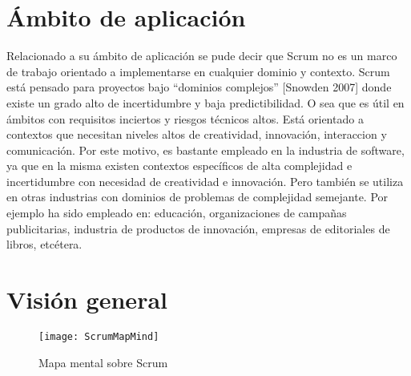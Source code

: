 \section{Ámbito de aplicación}

Relacionado a su ámbito de aplicación se pude decir que Scrum no es un marco de trabajo orientado a implementarse en cualquier dominio y contexto. Scrum está pensado para proyectos bajo “dominios complejos” [Snowden 2007] donde existe un grado alto de incertidumbre y baja predictibilidad. O sea que es útil en ámbitos con requisitos inciertos y riesgos técnicos altos. Está orientado a contextos que necesitan niveles altos de creatividad, innovación, interaccion y comunicación. Por este motivo, es bastante empleado en la industria de software, ya que en la misma existen contextos específicos de alta complejidad e incertidumbre con necesidad de creatividad e innovación. Pero también se utiliza en otras industrias con dominios de problemas de complejidad semejante. Por ejemplo ha sido empleado en: educación, organizaciones de campañas publicitarias, industria de productos de innovación, empresas de editoriales de libros, etcétera.

\section{Visión general}

\begin{figure}[h]
  \centering
  \texttt{[image: ScrumMapMind]}
  \caption{Mapa mental sobre Scrum}
  \centering
  \label{fig:ScrumMapMind} %
\end{figure}
